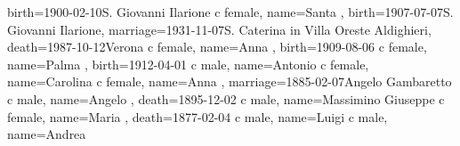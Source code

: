 \documentclass{article}
\begin{document}
\begin{midpage}
\begin{center}
\begin{genealogypicture}
{{{{{{                        birth={1900-02-10}{S. Giovanni Ilarione}
                    }
                    c{
                        female,
                        name={Santa },
                        birth={1907-07-07}{S. Giovanni Ilarione},
                        marriage={1931-11-07}{S. Caterina in Villa \newline Oreste Aldighieri},
                        death={1987-10-12}{Verona}
                    }
                    c{
                        female,
                        name={Anna },
                        birth={1909-08-06}{}
                    }
                    c{
                        female,
                        name={Palma },
                        birth={1912-04-01}{}
                    }
                    c{
                        male,
                        name={Antonio }
                    }
                    c{
                        female,
                        name={Carolina }
                    }
                }
                c{
                    female,
                    name={Anna },
                    marriage={1885-02-07}{Angelo Gambaretto}
                }
                c{
                    male,
                    name={Angelo },
                    death={1895-12-02}{}
                }
                c{
                    male,
                    name={Massimino Giuseppe }
                }
            }
            c{
                female,
                name={Maria },
                death={1877-02-04}{}
            }
            c{
                male,
                name={Luigi }
            }
        }
        c{
            male,
            name={Andrea }
        }
    }
}
\end{genealogypicture}

\end{center}
\end{midpage}
\end{document}
